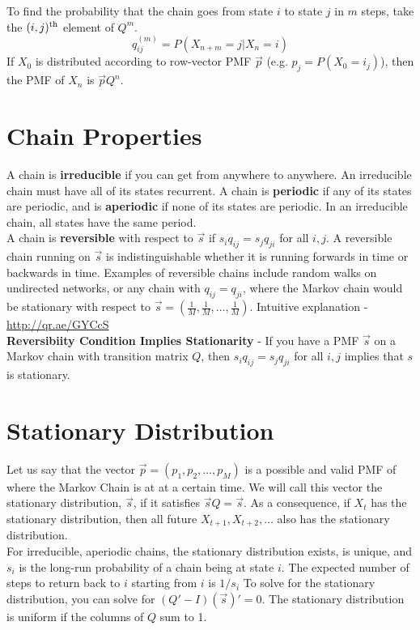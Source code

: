 \documentclass[11pt]{article}
\begin{document}
{To find the probability that the chain goes from state $i$ to state $j$ in $m$ steps, take the $(i, j)^\textnormal{th}$ element of $Q^m$.
\[q^{(m)}_{ij} = P(X_{n+m} = j | X_n = i)\]
If $X_0$ is distributed according to row-vector PMF $\vec{p}$ (e.g. $p_j = P(X_0 = i_j)$), then the PMF of $X_n$ is $\vec{p}Q^n$.



\section*{Chain Properties}
A chain is \textbf{irreducible} if you can get from anywhere to anywhere. An irreducible chain must have all of its states recurrent. A chain is \textbf{periodic} if any of its states are periodic, and is \textbf{aperiodic} if none of its states are periodic. In an irreducible chain, all states have the same period. \\

A chain is \textbf{reversible} with respect to $\vec{s}$ if $s_iq_{ij} = s_jq_{ji}$ for all $i, j$.  A reversible chain running on $\vec{s}$ is indistinguishable whether it is running forwards in time or backwards in time. Examples of reversible chains include random walks on undirected networks, or any chain with $q_{ij} = q_{ji}$, where the Markov chain would be stationary with respect to $\vec{s} = (\frac{1}{M}, \frac{1}{M}, \dots, \frac{1}{M})$. Intuitive explanation - \url{http://qr.ae/GYCcS} \\

\textbf{Reversibiity Condition Implies Stationarity} - If you have a PMF $\vec{s}$ on a Markov chain with transition matrix $Q$, then $s_iq_{ij} = s_jq_{ji}$ for all $i, j$ implies that $s$ is stationary.


\section*{Stationary Distribution}

Let us say that the vector $\vec{p} = (p_1, p_2, \dots, p_M)$ is a possible and valid PMF of where the Markov Chain is at at a certain time. We will call this vector the stationary distribution, $\vec{s}$, if it satisfies $\vec{s}Q = \vec{s}$. As a consequence, if $X_t$ has the stationary distribution, then all future $X_{t+1}, X_{t + 2}, \dots$ also has the stationary distribution. \\

For irreducible, aperiodic chains, the stationary distribution exists, is unique, and $s_i$ is the long-run probability of a chain being at state $i$. The expected number of steps to return back to $i$ starting from $i$ is $1/s_i$ To solve for the stationary distribution, you can solve for $(Q' - I)(\vec{s})' = 0$. The stationary distribution is uniform if the columns of $Q$ sum to 1.


}
\end{document}
